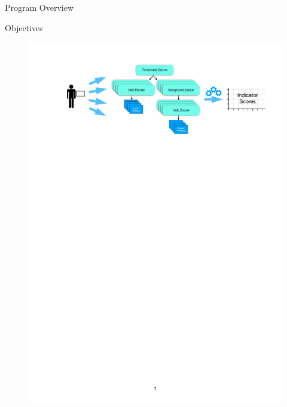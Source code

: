 \begin{frame}
\centering
\Large
Program Overview
\end{frame}

\begin{frame}{Objectives}

\begin{figure}
    \centering
    \includegraphics[width = \linewidth]{.figures/ProgramParts.pdf}
\end{figure}
\vfill
\end{frame}

